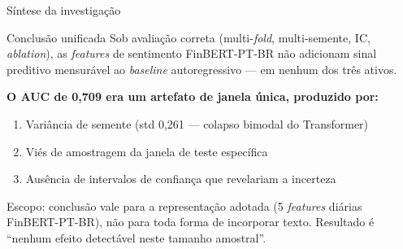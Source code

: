 \documentclass[10pt,aspectratio=169]{beamer}
\begin{document}
\begin{frame}{Síntese da investigação}
  \begin{block}{Conclusão unificada}
    Sob avaliação correta (multi-\textit{fold}, multi-semente, IC, \textit{ablation}),
    as \textit{features} de sentimento FinBERT-PT-BR \alert{não adicionam sinal
    preditivo mensurável} ao \textit{baseline} autoregressivo --- em nenhum
    dos três ativos.
  \end{block}
  \vspace{1ex}
  \textbf{O AUC de 0{,}709 era um artefato de janela única, produzido por:}
  \begin{enumerate}
    \item Variância de semente (std 0{,}261 --- colapso bimodal do Transformer)
    \item Viés de amostragem da janela de teste específica
    \item Ausência de intervalos de confiança que revelariam a incerteza
  \end{enumerate}
  \vspace{1ex}
  \footnotesize Escopo: conclusão vale para a representação adotada (5 \textit{features} diárias FinBERT-PT-BR),
  não para toda forma de incorporar texto. Resultado é ``nenhum efeito detectável neste tamanho amostral''.
\end{frame}
\end{document}
